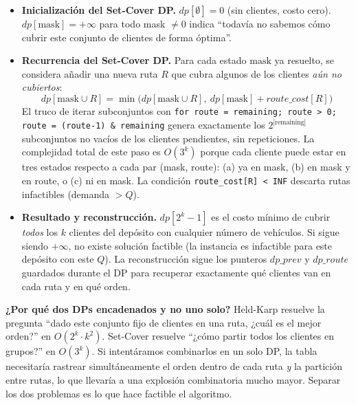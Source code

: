 \documentclass[12pt,a4paper]{article}
\begin{document}
\begin{itemize}[leftmargin=2cm]
\item[\textbf{L.13}] \textbf{Inicialización del Set-Cover DP.} $dp[\emptyset] = 0$ (sin clientes, costo cero). $dp[\text{mask}] = +\infty$ para todo mask $\neq 0$ indica ``todavía no sabemos cómo cubrir este conjunto de clientes de forma óptima''.

\item[\textbf{L.14--19}] \textbf{Recurrencia del Set-Cover DP.} Para cada estado $\text{mask}$ ya resuelto, se considera añadir una nueva ruta $R$ que cubra algunos de los clientes \emph{aún no cubiertos}:
$$dp[\text{mask} \cup R] = \min\bigl( dp[\text{mask} \cup R],\ dp[\text{mask}] + route\_cost[R] \bigr)$$
El truco de iterar subconjuntos con \texttt{for route = remaining; route > 0; route = (route-1) \& remaining} genera exactamente los $2^{|\text{remaining}|}$ subconjuntos no vacíos de los clientes pendientes, sin repeticiones. La complejidad total de este paso es $O(3^k)$ porque cada cliente puede estar en tres estados respecto a cada par (mask, route): (a) ya en mask, (b) en mask y en route, o (c) ni en mask. La condición \texttt{route\_cost[R] < INF} descarta rutas infactibles (demanda $> Q$).

\item[\textbf{L.20--21}] \textbf{Resultado y reconstrucción.} $dp[2^k - 1]$ es el costo mínimo de cubrir \emph{todos} los $k$ clientes del depósito con cualquier número de vehículos. Si sigue siendo $+\infty$, no existe solución factible (la instancia es infactible para este depósito con este $Q$). La reconstrucción sigue los punteros $dp\_prev$ y $dp\_route$ guardados durante el DP para recuperar exactamente qué clientes van en cada ruta y en qué orden.
\end{itemize}

\begin{nota}
\textbf{¿Por qué dos DPs encadenados y no uno solo?} Held-Karp resuelve la pregunta ``dado este conjunto fijo de clientes en una ruta, ¿cuál es el mejor orden?'' en $O(2^k \cdot k^2)$. Set-Cover resuelve ``¿cómo partir todos los clientes en grupos?'' en $O(3^k)$. Si intentáramos combinarlos en un solo DP, la tabla necesitaría rastrear simultáneamente el orden dentro de cada ruta \emph{y} la partición entre rutas, lo que llevaría a una explosión combinatoria mucho mayor. Separar los dos problemas es lo que hace factible el algoritmo.
\end{nota}
\end{document}
